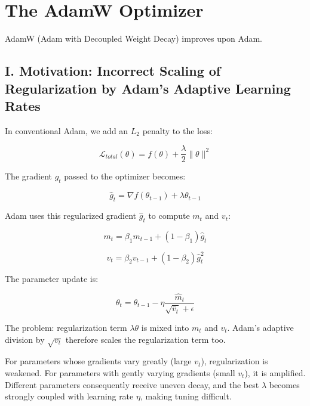 \setcounter{section}{4}

\hypertarget{the-adamw-optimizer}{%
\section{The AdamW Optimizer}\label{the-adamw-optimizer}}

AdamW (Adam with Decoupled Weight Decay) improves upon Adam.

\hypertarget{i.-motivation-incorrect-scaling-of-regularization-by-adams-adaptive-learning-rates}{%
\subsection{I. Motivation: Incorrect Scaling of Regularization by Adam's Adaptive Learning Rates}\label{i.-motivation-incorrect-scaling-of-regularization-by-adams-adaptive-learning-rates}}

In conventional Adam, we add an \(L_2\) penalty to the loss:

\[
\mathcal{L}_{total}(\theta) = f(\theta) + \frac{\lambda}{2}\lVert\theta\rVert^2
\]

The gradient \(\hat{g}_t\) passed to the optimizer becomes:

\[
\hat{g}_t = \nabla f(\theta_{t-1}) + \lambda\theta_{t-1}
\]

Adam uses this regularized gradient \(\hat{g}_t\) to compute \(m_t\) and \(v_t\):

\[
m_t = \beta_1m_{t-1} + (1-\beta_1)\hat{g}_t
\]

\[
v_t = \beta_2v_{t-1} + (1-\beta_2)\hat{g}_t^2
\]

The parameter update is:

\[
\theta_t = \theta_{t-1} - \eta\frac{\hat{m}_t}{\sqrt{\hat{v}_t}+\epsilon}
\]

The problem: regularization term \(\lambda\theta\) is mixed into \(m_t\) and \(v_t\). Adam's adaptive division by \(\sqrt{v_t}\) therefore scales the regularization term too.

For parameters whose gradients vary greatly (large \(v_t\)), regularization is weakened. For parameters with gently varying gradients (small \(v_t\)), it is amplified. Different parameters consequently receive uneven decay, and the best \(\lambda\) becomes strongly coupled with learning rate \(\eta\), making tuning difficult.


